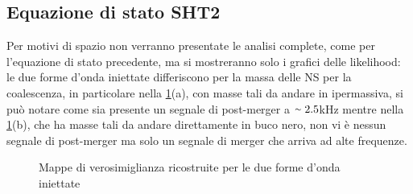 \subsection{Equazione di stato SHT2}
\label{subsection:SHT2}
Per motivi di spazio non verranno presentate le analisi complete, come per l'equazione di stato precedente, ma si mostreranno solo i grafici delle likelihood: le due forme d'onda iniettate differiscono per la massa delle NS per la coalescenza, in particolare nella \ref{fig:likelihood_sht2}(a), con masse tali da andare in ipermassiva, si può notare come sia presente un segnale di post-merger a $\smallsim 2.5$kHz mentre nella \ref{fig:likelihood_sht2}(b), che ha masse tali da andare direttamente in buco nero, non vi è nessun segnale di post-merger ma solo un segnale di merger che arriva ad alte frequenze. 
\begin{figure}[H]
	\vspace{-20pt}
	\centering
	\vspace{-5pt}
	\caption{Mappe di verosimiglianza ricostruite per le due forme d'onda iniettate}
	\label{fig:likelihood_sht2}
	\vspace{-15pt}
\end{figure}

